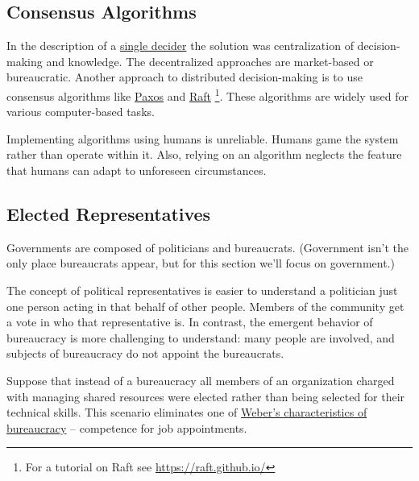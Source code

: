 \subsection*{Consensus Algorithms}

In the description of a \hyperref[sec:single-decider]{single decider}
the solution was centralization of decision-making and knowledge. The decentralized approaches are market-based or bureaucratic. Another approach to distributed decision-making is to use consensus algorithms like 
\href{https://en.wikipedia.org/wiki/Paxos_(computer_science)}{Paxos} and
\href{https://en.wikipedia.org/wiki/Raft_(algorithm)}{Raft}
\footnote{For a tutorial on Raft see \href{https://raft.github.io/}{https://raft.github.io/}}.
These algorithms are widely used for various computer-based tasks. 

Implementing algorithms using humans is unreliable. Humans game the system rather than operate within it. Also, relying on an algorithm neglects the feature that humans can adapt to unforeseen circumstances.

\subsection*{Elected Representatives}
Governments are composed of politicians and bureaucrats. (Government isn't the only place bureaucrats appear, but for this section we'll focus on government.)

The concept of political representatives is easier to understand a politician just one person acting in that behalf of other people. Members of the community get a vote in who that representative is.
In contrast, the emergent behavior of bureaucracy is more challenging to understand: many people are involved, and subjects of bureaucracy do not appoint the bureaucrats. 

Suppose that instead of a bureaucracy all members of an organization charged with managing \glspl{shared resource} were elected rather than being selected for their technical skills. This scenario eliminates one of \href{https://en.wikipedia.org/wiki/Bureaucracy#Max_Weber}{Weber's characteristics of bureaucracy}
-- competence for job appointments. 

